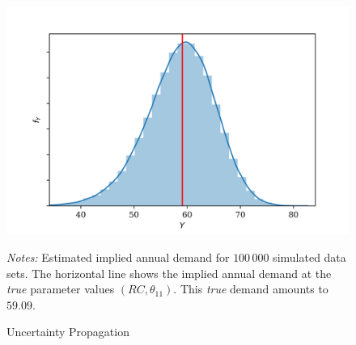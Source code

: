 \begin{figure}[t]
	\caption{Uncertainty Propagation}
    \label{uncertainty}
	\begin{centering}
	\vspace*{-4mm}
	\begin{centering}
		\includegraphics[scale=0.9]{../figures/uncertainty_propagation_100000.png}
	\end{centering}
	\end{centering}

	\small
	\textit{Notes:} Estimated implied annual demand for $100\,000$ simulated data sets. The horizontal line shows the implied annual demand at the \textit{true} parameter values $(RC, \theta_{11})$. This \textit{true} demand amounts to $59.09$.
\end{figure}